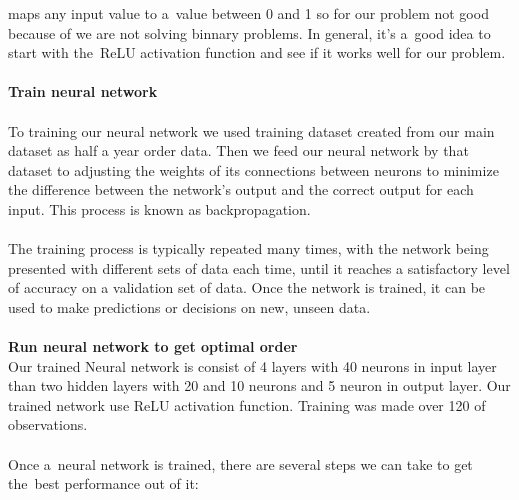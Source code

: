         maps any input value to a~value between 0 and 1 so for our problem not good because of we are not solving binnary problems. In general, it's a~good idea to start with the~ReLU activation function and see if it works well for our problem.\\
        \\  
        \textbf{Train neural network}\\
        \\
        To training our neural network we used training dataset created from our main dataset as half a year order data. Then we feed our neural network by that dataset to adjusting the weights of its connections between neurons to minimize the difference between the network's output and the correct output for each input. This process is known as backpropagation.\\
        \\
        The training process is typically repeated many times, with the network being presented with different sets of data each time, until it reaches a satisfactory level of accuracy on a validation set of data. Once the network is trained, it can be used to make predictions or decisions on new, unseen data.\\
        \\
        \textbf{Run neural network to get optimal order}\\
        Our trained Neural network is consist of 4 layers with 40 neurons in input layer than two hidden layers with 20 and 10 neurons and 5 neuron in output layer. Our trained network use ReLU activation function. Training was made over 120 of observations.\\
        \\
        Once a~neural network is trained, there are several steps we can take to get the~best performance out of it:
